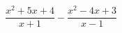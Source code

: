 \begin{ex}[type=expression]
	\begin{condition}
		\(\dfrac{x^2+5x+4}{x+1}-\dfrac{x^2-4x+3}{x-1}\)
	\end{condition}
\end{ex}